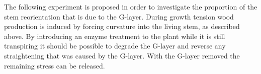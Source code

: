 The following experiment is proposed in order to investigate the proportion of
the stem reorientation that is due to the G-layer. During growth tension wood
production is induced by forcing curvature into the living stem, as described
above. By introducing an enzyme treatment to the plant while it is still
transpiring it should be possible to degrade the G-layer and reverse any straightening that was caused
by the G-layer. With the G-layer removed the remaining stress can be released.